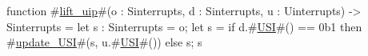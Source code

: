 function #\hyperref[sailRISCVzliftzyuip]{lift\_uip}#(o : Sinterrupts, d : Sinterrupts, u : Uinterrupts) -> Sinterrupts = {
  let s : Sinterrupts = o;
  let s = if d.#\hyperref[sailRISCVzUSI]{USI}#() == 0b1 then #\hyperref[sailRISCVzupdatezyUSI]{update\_USI}#(s, u.#\hyperref[sailRISCVzUSI]{USI}#()) else s;
  s
}
